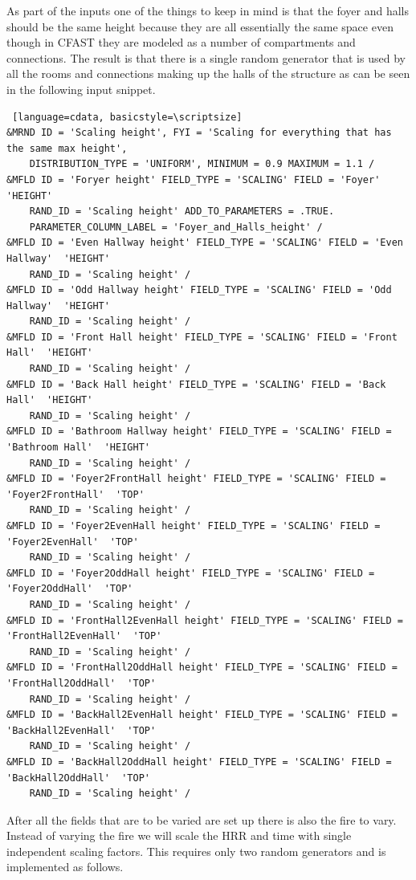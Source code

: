 \documentclass[12pt,twoside]{book}
\begin{document}
As part of the inputs one of the things to keep in mind is that the foyer and halls should be the same height because they are all essentially the same space even though in CFAST they are modeled as a number of compartments and connections. The result is that there is a single random generator that is used by all the rooms and connections making up the halls of the structure as can be seen in the following input snippet.


\vspace{\baselineskip}
\begin{lstlisting} [language=cdata, basicstyle=\scriptsize]
&MRND ID = 'Scaling height', FYI = 'Scaling for everything that has the same max height',
    DISTRIBUTION_TYPE = 'UNIFORM', MINIMUM = 0.9 MAXIMUM = 1.1 /
&MFLD ID = 'Foryer height' FIELD_TYPE = 'SCALING' FIELD = 'Foyer'  'HEIGHT'
    RAND_ID = 'Scaling height' ADD_TO_PARAMETERS = .TRUE.
    PARAMETER_COLUMN_LABEL = 'Foyer_and_Halls_height' /
&MFLD ID = 'Even Hallway height' FIELD_TYPE = 'SCALING' FIELD = 'Even Hallway'  'HEIGHT'
    RAND_ID = 'Scaling height' /
&MFLD ID = 'Odd Hallway height' FIELD_TYPE = 'SCALING' FIELD = 'Odd Hallway'  'HEIGHT'
    RAND_ID = 'Scaling height' /
&MFLD ID = 'Front Hall height' FIELD_TYPE = 'SCALING' FIELD = 'Front Hall'  'HEIGHT'
    RAND_ID = 'Scaling height' /
&MFLD ID = 'Back Hall height' FIELD_TYPE = 'SCALING' FIELD = 'Back Hall'  'HEIGHT'
    RAND_ID = 'Scaling height' /
&MFLD ID = 'Bathroom Hallway height' FIELD_TYPE = 'SCALING' FIELD = 'Bathroom Hall'  'HEIGHT'
    RAND_ID = 'Scaling height' /
&MFLD ID = 'Foyer2FrontHall height' FIELD_TYPE = 'SCALING' FIELD = 'Foyer2FrontHall'  'TOP'
    RAND_ID = 'Scaling height' /
&MFLD ID = 'Foyer2EvenHall height' FIELD_TYPE = 'SCALING' FIELD = 'Foyer2EvenHall'  'TOP'
    RAND_ID = 'Scaling height' /
&MFLD ID = 'Foyer2OddHall height' FIELD_TYPE = 'SCALING' FIELD = 'Foyer2OddHall'  'TOP'
    RAND_ID = 'Scaling height' /
&MFLD ID = 'FrontHall2EvenHall height' FIELD_TYPE = 'SCALING' FIELD = 'FrontHall2EvenHall'  'TOP'
    RAND_ID = 'Scaling height' /
&MFLD ID = 'FrontHall2OddHall height' FIELD_TYPE = 'SCALING' FIELD = 'FrontHall2OddHall'  'TOP'
    RAND_ID = 'Scaling height' /
&MFLD ID = 'BackHall2EvenHall height' FIELD_TYPE = 'SCALING' FIELD = 'BackHall2EvenHall'  'TOP'
    RAND_ID = 'Scaling height' /
&MFLD ID = 'BackHall2OddHall height' FIELD_TYPE = 'SCALING' FIELD = 'BackHall2OddHall'  'TOP'
    RAND_ID = 'Scaling height' /
\end{lstlisting}

After all the fields that are to be varied are set up there is also the fire to vary. Instead of varying the fire we will scale the HRR and time with single independent scaling factors. This requires only two random generators and is implemented as follows.
\end{document}
